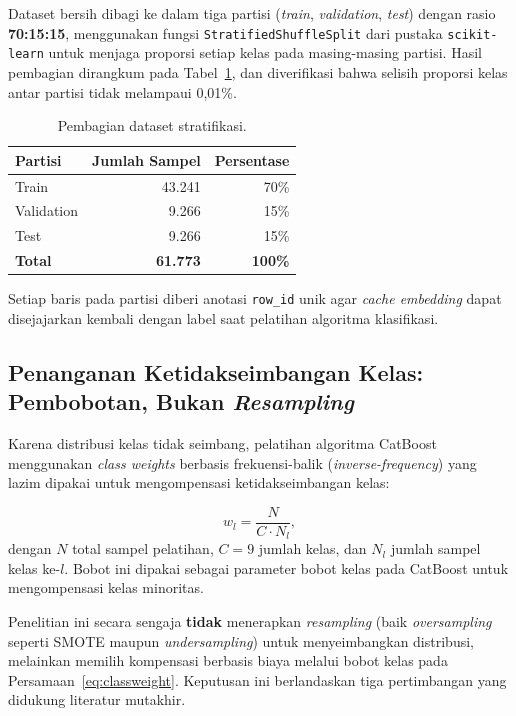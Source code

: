 Dataset bersih dibagi ke dalam tiga partisi (\textit{train}, \textit{validation}, \textit{test}) dengan rasio \textbf{70:15:15}, menggunakan fungsi \texttt{StratifiedShuffleSplit} dari pustaka \texttt{scikit-learn} untuk menjaga proporsi setiap kelas pada masing-masing partisi. Hasil pembagian dirangkum pada Tabel~\ref{tab:split}, dan diverifikasi bahwa selisih proporsi kelas antar partisi tidak melampaui 0{,}01\%.

\begin{table}[htbp]
\centering
\caption{Pembagian dataset stratifikasi.}
\label{tab:split}
\begin{tabular}{l r r}
\toprule
\textbf{Partisi} & \textbf{Jumlah Sampel} & \textbf{Persentase} \\
\midrule
Train & 43.241 & 70\% \\
Validation & 9.266 & 15\% \\
Test & 9.266 & 15\% \\
\midrule
\textbf{Total} & \textbf{61.773} & \textbf{100\%} \\
\bottomrule
\end{tabular}
\end{table}

Setiap baris pada partisi diberi anotasi \texttt{row\_id} unik agar \textit{cache embedding} dapat disejajarkan kembali dengan label saat pelatihan algoritma klasifikasi.

\subsection{Penanganan Ketidakseimbangan Kelas: Pembobotan, Bukan \textit{Resampling}}
\label{sec:bobot-kelas}

Karena distribusi kelas tidak seimbang, pelatihan algoritma CatBoost menggunakan \textit{class weights} berbasis frekuensi-balik (\textit{inverse-frequency}) yang lazim dipakai untuk mengompensasi ketidakseimbangan kelas:

\begin{equation}
    w_l = \frac{N}{C \cdot N_l},
    \label{eq:classweight}
\end{equation}
dengan $N$ total sampel pelatihan, $C = 9$ jumlah kelas, dan $N_l$ jumlah sampel kelas ke-$l$. Bobot ini dipakai sebagai parameter bobot kelas pada CatBoost untuk mengompensasi kelas minoritas.

Penelitian ini secara sengaja \textbf{tidak} menerapkan \textit{resampling} (baik \textit{oversampling} seperti SMOTE maupun \textit{undersampling}) untuk menyeimbangkan distribusi, melainkan memilih kompensasi berbasis biaya melalui bobot kelas pada Persamaan~\ref{eq:classweight}. Keputusan ini berlandaskan tiga pertimbangan yang didukung literatur mutakhir.

